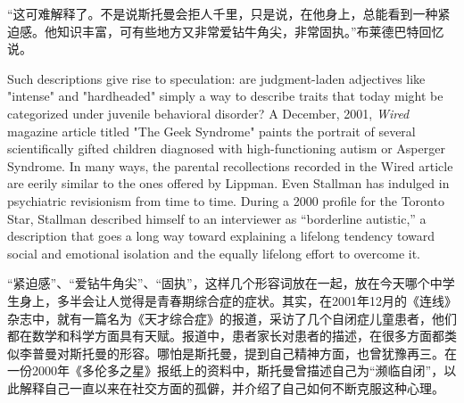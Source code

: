 \ifdefined\chs
``这可难解释了。不是说斯托曼会拒人千里，只是说，在他身上，总能看到一种紧迫感。他知识丰富，可有些地方又非常爱钻牛角尖，非常固执。''布莱德巴特回忆说。
\fi

\ifdefined\eng
Such descriptions give rise to speculation: are judgment-laden adjectives like "intense" and "hardheaded" simply a way to describe traits that today might be categorized under juvenile behavioral disorder? A December, 2001, \textit{Wired} magazine article titled "The Geek Syndrome" paints the portrait of several scientifically gifted children diagnosed with high-functioning autism or Asperger Syndrome. In many ways, the parental recollections recorded in the Wired article are eerily similar to the ones offered by Lippman. Even Stallman has indulged in psychiatric revisionism from time to time. During a 2000 profile for the Toronto Star, Stallman described himself to an interviewer as ``borderline autistic,'' a description that goes a long way toward explaining a lifelong tendency toward social and emotional isolation and the equally lifelong effort to overcome it.

\fi

\ifdefined\chs
``紧迫感''、``爱钻牛角尖''、``固执''，这样几个形容词放在一起，放在今天哪个中学生身上，多半会让人觉得是青春期综合症的症状。其实，在2001年12月的《连线》杂志中，就有一篇名为《天才综合症》的报道，采访了几个自闭症儿童患者，他们都在数学和科学方面具有天赋。报道中，患者家长对患者的描述，在很多方面都类似李普曼对斯托曼的形容。哪怕是斯托曼，提到自己精神方面，也曾犹豫再三。在一份2000年《多伦多之星》报纸上的资料中，斯托曼曾描述自己为``濒临自闭''，以此解释自己一直以来在社交方面的孤僻，并介绍了自己如何不断克服这种心理。
\fi

